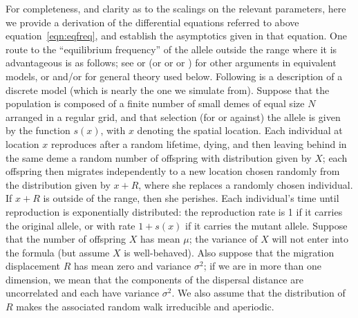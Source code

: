 \documentclass{article}
\newcommand{\citet}[1]{\cite{#1}}
\begin{document}
For completeness, and clarity as to the scalings on the relevant parameters,
here we provide a derivation of the differential equations referred to above equation~\eqref{eqn:eqfreq},
and establish the asymptotics given in that equation.
One route to the ``equilibrium frequency'' of the allele outside the range where it is advantageous is as follows;
see \citet{slatkin1973geneflow} or \citet{barton1987establishment,pollak1966survival} (or \citet{KPP1937book} or \citet{fisher1937wave} or \citet{haldane1948theory})
for other arguments in equivalent models,
or \citet{etheridge2000introduction} and/or \citet{dawson1993measurevalued} for general theory used below.
Following is a description of a discrete model (which is nearly the one we simulate from).
Suppose that the population is composed of a finite number of small demes of equal size $N$ arranged in a regular grid,
and that selection (for or against) the allele is given by the function $s(x)$, with $x$ denoting the spatial location.
Each individual at location $x$ reproduces after a random lifetime,
dying, and then leaving behind in the same deme a random number of offspring with distribution given by $X$;
each offspring then migrates independently to a new location chosen randomly from the distribution given by $x+R$,
where she replaces a randomly chosen individual.
If $x+R$ is outside of the range, then she perishes.
Each individual's time until reproduction is exponentially distributed:
the reproduction rate is 1 if it carries the original allele, or with rate $1+s(x)$ if it carries the mutant allele.
Suppose that the number of offspring $X$ has mean $\mu$; the variance of $X$ will not enter into the formula
(but assume $X$ is well-behaved).
Also suppose that the migration displacement $R$ has mean zero and variance $\sigma^2$;
if we are in more than one dimension, we mean that the components of the dispersal distance are uncorrelated
and each have variance $\sigma^2$.
We also assume that the distribution of $R$ makes the associated random walk irreducible and aperiodic.
\end{document}
